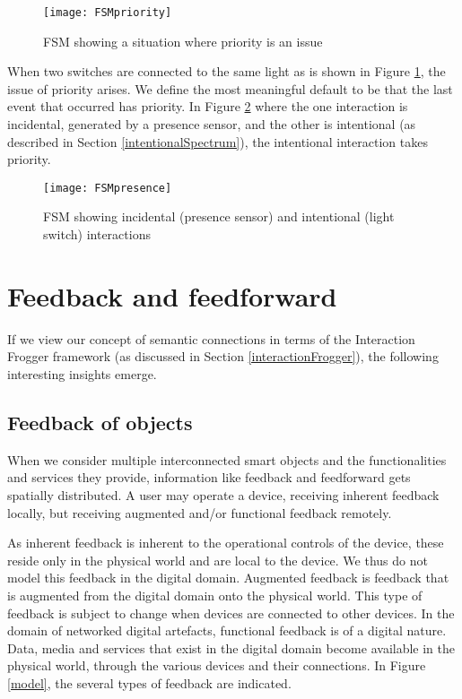 \begin{figure}
\centerline{\texttt{[image: FSMpriority]}}
\caption{FSM showing a situation where priority is an issue}
\label{FSMpriority}
\end{figure}

When two switches are connected to the same light as is shown in Figure \ref{FSMpriority}, the issue of priority arises. We define the most meaningful default to be that the last event that occurred has priority. In Figure \ref{FSMpresence} where the one interaction is incidental, generated by a presence sensor, and the other is intentional (as described in Section \ref{intentionalSpectrum}), the intentional interaction takes priority.

\begin{figure}
\centerline{\texttt{[image: FSMpresence]}}
\caption{FSM showing incidental (presence sensor) and intentional (light switch) interactions}
\label{FSMpresence}
\end{figure}


\section{Feedback and feedforward}
\label{feedbackforward}
If we view our concept of semantic connections in terms of the Interaction Frogger framework (as discussed in Section \ref{interactionFrogger}), the following interesting insights emerge.

\subsection{Feedback of objects}
When we consider multiple interconnected smart objects and the functionalities and services they provide, information like feedback and feedforward gets spatially distributed. A user may operate a device, receiving inherent feedback locally, but receiving augmented and/or functional feedback remotely. 

As inherent feedback is inherent to the operational controls of the device, these reside only in the physical world and are local to the device. We thus do not model this feedback in the digital domain. Augmented feedback is feedback that is augmented from the digital domain onto the physical world. This type of feedback is subject to change when devices are connected to other devices. In the domain of networked digital artefacts, functional feedback is of a digital nature. Data, media and services that exist in the digital domain become available in the physical world, through the various devices and their connections. In Figure \ref{model}, the several types of feedback are indicated. 

